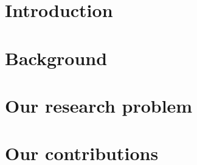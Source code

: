 \documentclass[showtrims, oldfontcommands]{kthesis}
\begin{document}

\pagestyle{headings}

%
% 

%
\clearforchapter
\tableofcontents
\cleardoublepage

\mainmatter

%
\cleardoublepage
\chapter{Introduction}
    \label{chapter:thesis:introduction}

\clearpage

%
\cleardoublepage
\chapter{Background}
    \label{chapter:thesis:background}

\clearpage

%
\cleardoublepage
\chapter{Our research problem}
    \label{chapter:thesis:our-research-problem}

\clearpage

%
\cleardoublepage
\chapter{Our contributions}
    \label{chapter:thesis:our-contributions}
\renewcommand\thesection{\Alph{section}}

\clearpage

%
\cleardoublepage
\renewcommand\thesection{\thechapter.\arabic{section}}

\clearpage

%
\cleardoublepage
\end{document}
